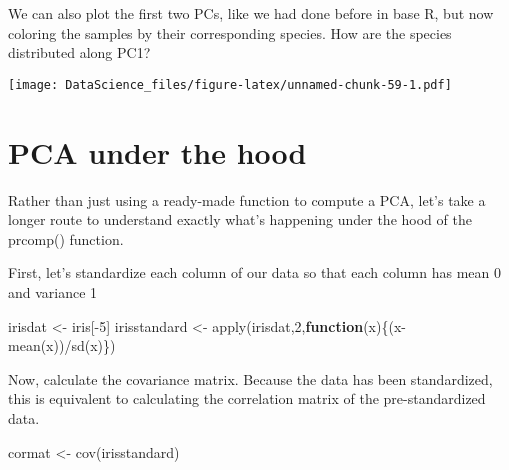 \documentclass[
]{book}
\newenvironment{Shaded}{\begin{snugshade}}{\end{snugshade}}
\newcommand{\AttributeTok}[1]{\textcolor[rgb]{0.77,0.63,0.00}{#1}}
\newcommand{\ControlFlowTok}[1]{\textcolor[rgb]{0.13,0.29,0.53}{\textbf{#1}}}
\newcommand{\DecValTok}[1]{\textcolor[rgb]{0.00,0.00,0.81}{#1}}
\newcommand{\FunctionTok}[1]{\textcolor[rgb]{0.00,0.00,0.00}{#1}}
\newcommand{\NormalTok}[1]{#1}
\newcommand{\OtherTok}[1]{\textcolor[rgb]{0.56,0.35,0.01}{#1}}
\newcommand{\SpecialCharTok}[1]{\textcolor[rgb]{0.00,0.00,0.00}{#1}}
\begin{document}
We can also plot the first two PCs, like we had done before in base R, but now coloring the samples by their corresponding species. How are the species distributed along PC1?

\begin{Shaded}
\end{Shaded}

\texttt{[image: DataScience\_files/figure-latex/unnamed-chunk-59-1.pdf]}

\hypertarget{pca-under-the-hood}{%
\section{PCA under the hood}\label{pca-under-the-hood}}

Rather than just using a ready-made function to compute a PCA, let's take a longer route to understand exactly what's happening under the hood of the prcomp() function.

First, let's standardize each column of our data so that each column has mean 0 and variance 1

\begin{Shaded}
\begin{Highlighting}[]
\NormalTok{irisdat }\OtherTok{\textless{}{-}}\NormalTok{ iris[}\SpecialCharTok{{-}}\DecValTok{5}\NormalTok{]}
\NormalTok{irisstandard }\OtherTok{\textless{}{-}} \FunctionTok{apply}\NormalTok{(irisdat,}\DecValTok{2}\NormalTok{,}\ControlFlowTok{function}\NormalTok{(x)\{(x}\SpecialCharTok{{-}}\FunctionTok{mean}\NormalTok{(x))}\SpecialCharTok{/}\FunctionTok{sd}\NormalTok{(x)\})}
\end{Highlighting}
\end{Shaded}

Now, calculate the covariance matrix. Because the data has been standardized, this is equivalent to calculating the correlation matrix of the pre-standardized data.

\begin{Shaded}
\begin{Highlighting}[]
\NormalTok{cormat }\OtherTok{\textless{}{-}} \FunctionTok{cov}\NormalTok{(irisstandard)}
\end{Highlighting}
\end{Shaded}
\end{document}
